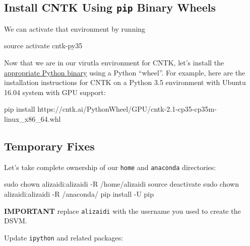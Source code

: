 \documentclass[]{book}
\newenvironment{Shaded}{\begin{snugshade}}{\end{snugshade}}
\newcommand{\FunctionTok}[1]{\textcolor[rgb]{0.00,0.00,0.00}{#1}}
\newcommand{\BuiltInTok}[1]{#1}
\newcommand{\ExtensionTok}[1]{#1}
\newcommand{\NormalTok}[1]{#1}
\theoremstyle{definition}
\theoremstyle{definition}
\theoremstyle{definition}
\theoremstyle{remark}
\begin{document}
\subsection{\texorpdfstring{Install CNTK Using \texttt{pip} Binary
Wheels}{Install CNTK Using pip Binary Wheels}}\label{install-cntk-using-pip-binary-wheels}

We can activate that environment by running

\begin{Shaded}
\begin{Highlighting}[]
\BuiltInTok{source}\NormalTok{ activate cntk-py35}
\end{Highlighting}
\end{Shaded}

Now that we are in our virutla environment for CNTK, let's install the
\href{https://docs.microsoft.com/en-us/cognitive-toolkit/setup-linux-python?tabs=cntkpy21}{appropriate
Python binary} using a Python ``wheel''. For example, here are the
installation instructions for CNTK on a Python 3.5 environment with
Ubuntu 16.04 system with GPU support:

\begin{Shaded}
\begin{Highlighting}[]
\ExtensionTok{pip}\NormalTok{ install https://cntk.ai/PythonWheel/GPU/cntk-2.1-cp35-cp35m-linux_x86_64.whl}
\end{Highlighting}
\end{Shaded}

\subsection{Temporary Fixes}\label{temporary-fixes}

Let's take complete ownership of our \texttt{home} and \texttt{anaconda}
directories:

\begin{Shaded}
\begin{Highlighting}[]
\FunctionTok{sudo}\NormalTok{ chown alizaidi:alizaidi -R /home/alizaidi}
\BuiltInTok{source}\NormalTok{ deactivate}
\FunctionTok{sudo}\NormalTok{ chown alizaidi:alizaidi -R /anaconda/}
\ExtensionTok{pip}\NormalTok{ install -U pip}
\end{Highlighting}
\end{Shaded}

\textbf{IMPORTANT} replace \texttt{alizaidi} with the username you used
to create the DSVM.

Update \texttt{ipython} and related packages:
\end{document}
